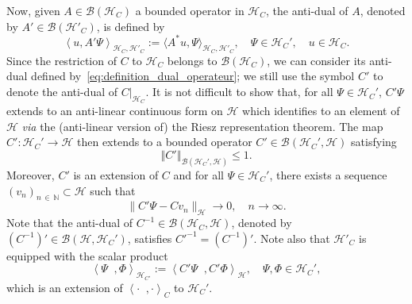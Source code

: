 \documentclass[AHL,Unicode,longabstracts,published]{cedram}
\newcommand{\Hi}{\mathcal{H}}
\newcommand{\N}{\mathbb{N}}
\newcommand{\norme}[1]{\left\Vert #1\right\Vert}
\newcommand{\scal}[2]{\left\langle{#1} \middle., {#2}\right\rangle}
\newcommand{\clB}{\mathcal{B}}
\newcommand{\Hi}{\mathcal{H}}
\begin{document}
Now, given $A\in\clB(\Hi_C)$ a bounded operator in $\Hi_C$, the anti-dual of $A$, denoted by $A'\in\clB(\Hi'_C)$, is defined by
\begin{equation}\label{eq:definition_dual_operateur}
\left\langle u, A'\Psi \right\rangle_{\Hi_C,\Hi'_C}:=\langle A^* u,\Psi\rangle_{\Hi_C,\Hi'_C}, \quad \Psi\in\Hi_C', \quad u\in\Hi_C.
\end{equation}
Since the restriction of $C$ to $\Hi_C$ belongs to $\clB(\Hi_C)$, we can consider its anti-dual defined by~\eqref{eq:definition_dual_operateur}; we still use the symbol $C'$ to denote the anti-dual of $C|_{\Hi_C}$. It is not difficult to show that, for all $\Psi\in\Hi_C'$, $C'\Psi$ extends to an anti-linear continuous form on $\Hi$ which identifies to an element of $\Hi$ \emph{via} the (anti-linear version of) the Riesz representation theorem. The map $C':\Hi_C'\to\Hi$ then extends to a bounded operator $C'\in\clB(\Hi_C',\Hi)$ satisfying
\begin{equation*}
\norme{C'}_{\clB(\Hi_C',\Hi)}\leq 1.
\end{equation*}
Moreover, $C'$ is an extension of $C$ and for all $\Psi\in\Hi_C'$, there exists a sequence $(v_n)_{n\,\in\,\N}\subset \Hi$ such that
\begin{equation*}
\big \|C'\Psi - Cv_n \big \|_\Hi \to 0, \quad n \to \infty.
\end{equation*}
Note that the anti-dual of $C^{-1}\in\clB(\Hi_C,\Hi)$, denoted by $(C^{-1})'\in\clB(\Hi,\Hi_C')$, satisfies $C'^{-1}=(C^{-1})'$. Note also that $\Hi'_C$ is equipped with the scalar product
\begin{equation*}
\scal{\Psi}{\Phi}_{\Hi_{C'}}:=\scal{C'\Psi}{C'\Phi}_\Hi, \quad \Psi,\Phi\in\Hi_C',
\end{equation*}
which is an extension of $\scal{\cdot}{\cdot}_C$ to $\Hi_C'$.
\end{document}
